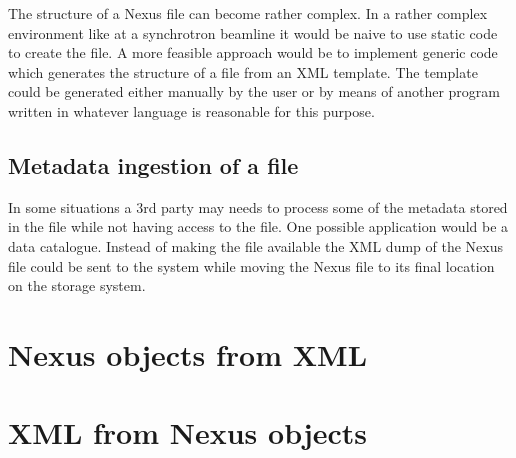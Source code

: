 The structure of a Nexus file can become rather complex. In a rather complex 
environment like at a synchrotron beamline it would be naive to use static 
code to create the file. A more feasible approach would be to implement 
generic code which generates the structure of a file from an XML template. 
The template could be generated either manually by the user or by means 
of another program written in whatever language is reasonable for this purpose. 

\subsection{Metadata ingestion of a file}

In some situations a $3$rd party may needs to process some of the metadata 
stored in the file while not having access to the file. One possible application
would be a data catalogue. Instead of making the file available the XML dump 
of the Nexus file could be sent to the system while moving the Nexus file 
to its final location on the storage system.

\section{Nexus objects from XML}\label{sec:xml::nxtoxml}

\section{XML from Nexus objects}\label{sec:xml::xmltonx}

